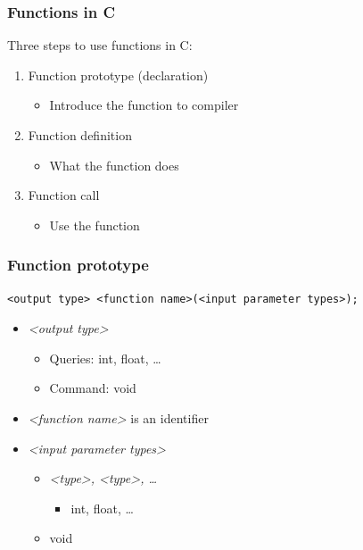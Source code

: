 \documentclass{../c-lecture}
\begin{document}
\begin{frame}
  \frametitle{Functions in C}
  Three steps to use functions in C:
  \begin{enumerate}
    \item Function prototype (declaration)
    \begin{itemize}
      \item Introduce the function to compiler
    \end{itemize}
    \item Function definition
    \begin{itemize}
      \item What the function does
    \end{itemize}
    \item Function call
    \begin{itemize}
      \item Use the function
    \end{itemize}
  \end{enumerate}
\end{frame}

\begin{frame}[fragile]
  \frametitle{Function \textbf{prototype}}
  \begin{verbatim}
<output type> <function name>(<input parameter types>);
  \end{verbatim}
  \begin{itemize}
    \item \textit{<output type>}
    \begin{itemize}
      \item \textmd{\color{Orange} Queries}: int, float, \ldots
      \item \textmd{\color{LimeGreen} Command}: void
    \end{itemize}
    \item
      \textit{<function name>} is an identifier
    \item \textit{<input parameter types>}
    \begin{itemize}
      \item \textit{<type>, <type>, \ldots}
      \begin{itemize}
        \item int, float, \ldots
      \end{itemize}
      \item void
    \end{itemize}
  \end{itemize}
\end{frame}
\end{document}
